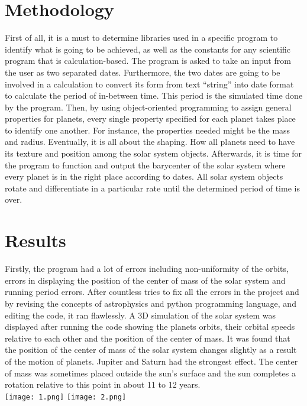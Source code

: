 \documentclass{article}
\begin{document}
\section{Methodology}
  First of all, it is a must to determine libraries used in a specific program to identify what is going to be achieved, as well as the constants for any scientific program that is calculation-based. The program is asked to take an input from the user as two separated dates. Furthermore, the two dates are going to be involved in a calculation to convert its form from text “string” into date format to calculate the period of in-between time. This period is the simulated time done by the program. 
  Then, by using object-oriented programming to assign general properties for planets, every single property specified for each planet takes place to identify one another. For instance, the properties needed might be the mass and radius. 
 Eventually, it is all about the shaping. How all planets need to have its texture and position among the solar system objects. Afterwards, it is time for the program to function and output the barycenter of the solar system where every planet is in the right place according to dates. All solar system objects rotate and differentiate in a particular rate until the determined period of time is over. 



       
\section{Results}
Firstly, the program had a lot of errors including non-uniformity of the orbits, errors in displaying the position of the center of mass of the solar system and running period errors. 
After countless tries to fix all the errors in the project and by revising the concepts of astrophysics and python programming language, and editing the code, it ran flawlessly.
A 3D simulation of the solar system was displayed after running the code showingٍ the planets orbits, their orbital speeds relative to each other and the position of the center of mass. It was found that the position of the center of mass of the solar system changes slightly as a result of the motion of planets. Jupiter and Saturn had the strongest effect. The center of mass was sometimes placed outside the sun’s surface and the sun completes a rotation relative to this point in about 11 to 12 years. \\
\texttt{[image: 1.png]}
\texttt{[image: 2.png]}
\end{document}
